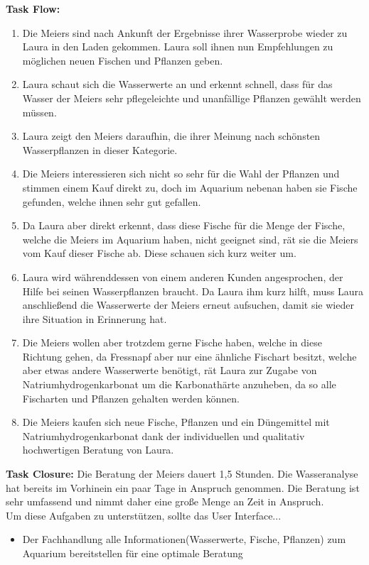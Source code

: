 \textbf{Task Flow:}
\begin{enumerate}
\item Die Meiers sind nach Ankunft der Ergebnisse ihrer Wasserprobe wieder zu Laura in den Laden gekommen. Laura soll ihnen nun Empfehlungen zu möglichen neuen Fischen und Pflanzen geben.
\item Laura schaut sich die Wasserwerte an und erkennt schnell, dass für das Wasser der Meiers sehr pflegeleichte und unanfällige Pflanzen gewählt werden müssen. 
\item Laura zeigt den Meiers daraufhin, die ihrer Meinung nach schönsten Wasserpflanzen in dieser Kategorie. 
\item Die Meiers interessieren sich nicht so sehr für die Wahl der Pflanzen und stimmen einem Kauf direkt zu, doch im Aquarium nebenan haben sie Fische gefunden, welche ihnen sehr gut gefallen.
\item Da Laura aber direkt erkennt, dass diese Fische für die Menge der Fische, welche die Meiers im Aquarium haben, nicht geeignet sind, rät sie die Meiers vom Kauf dieser Fische ab. Diese schauen sich kurz weiter um.
\item Laura wird währenddessen von einem anderen Kunden angesprochen, der Hilfe bei seinen Wasserpflanzen braucht. Da Laura ihm kurz hilft, muss Laura anschließend die Wasserwerte der Meiers erneut aufsuchen, damit sie wieder ihre Situation in Erinnerung hat.
\item Die Meiers wollen aber trotzdem gerne Fische haben, welche in diese Richtung gehen, da Fressnapf aber nur eine ähnliche Fischart besitzt, welche aber etwas andere Wasserwerte benötigt, rät Laura zur Zugabe von Natriumhydrogenkarbonat um die Karbonathärte anzuheben, da so alle Fischarten und Pflanzen gehalten werden können.
\item Die Meiers kaufen sich neue Fische, Pflanzen und ein Düngemittel mit Natriumhydrogenkarbonat dank der individuellen und qualitativ hochwertigen Beratung von Laura.
\end{enumerate}

\textbf{Task Closure:} Die Beratung der Meiers dauert 1,5 Stunden. Die Wasseranalyse hat bereits im Vorhinein ein paar Tage in Anspruch genommen. Die Beratung ist sehr umfassend und nimmt daher eine große Menge an Zeit in Anspruch.\\

Um diese Aufgaben zu unterstützen, sollte das User Interface...
\begin{itemize}
  \item Der Fachhandlung alle Informationen(Wasserwerte, Fische, Pflanzen) zum Aquarium bereitstellen für eine optimale Beratung
\end{itemize}



